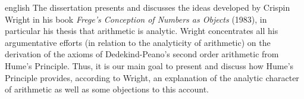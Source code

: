 \documentclass[diss]{UFRuralRJ}
\begin{document}
\begin{generalabstract}{english}{\tituloEN}{\chavesEN}{\nivelEN} %
  The dissertation presents and discusses the ideas developed by Crispin Wright
  in his book \textit{Frege's Conception of Numbers as Objects} (1983), in 
  particular his thesis that arithmetic is analytic. Wright concentrates all 
  his argumentative efforts (in relation to the analyticity of arithmetic) on 
  the derivation of the axioms of Dedekind-Peano's second order arithmetic from
  Hume's Principle. Thus, it is our main goal to present and discuss how Hume's 
  Principle provides, according to Wright, an explanation of the analytic 
  character of arithmetic as well as some objections to this account.
\end{generalabstract}





\tableofcontents %


\end{document}

